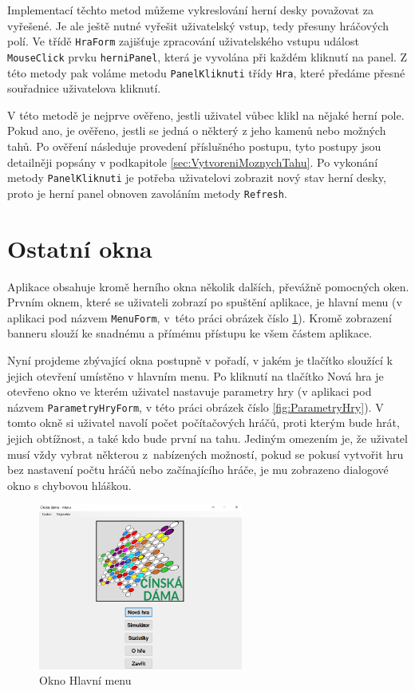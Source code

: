 Implementací těchto metod můžeme vykreslování herní desky považovat za vyřešené. Je ale ještě nutné vyřešit uživatelský vstup, tedy přesuny hráčových polí. Ve třídě \lstinline$HraForm$ zajišťuje zpracování uživatelského vstupu událost \lstinline$MouseClick$ prvku \lstinline$herniPanel$, která je vyvolána při každém kliknutí na panel. Z této metody pak voláme metodu \lstinline$PanelKliknuti$ třídy \lstinline$Hra$, které předáme přesné souřadnice uživatelova kliknutí. 

V této metodě je nejprve ověřeno, jestli uživatel vůbec klikl na nějaké herní pole. Pokud ano, je ověřeno, jestli se jedná o některý z jeho kamenů nebo možných tahů. Po ověření následuje provedení příslušného postupu, tyto postupy jsou detailněji popsány v podkapitole \ref{sec:VytvoreniMoznychTahu}. Po vykonání metody \lstinline$PanelKliknuti$ je potřeba uživatelovi zobrazit nový stav herní desky, proto je herní panel obnoven zavoláním metody \lstinline$Refresh$.


\section{Ostatní okna}
Aplikace obsahuje kromě herního okna několik dalších, převážně pomocných oken. Prvním oknem, které se uživateli zobrazí po spuštění aplikace, je hlavní menu (v aplikaci pod názvem \lstinline$MenuForm$, v~této práci obrázek číslo \ref{fig:HlavniMenu}). Kromě zobrazení banneru slouží ke snadnému a přímému přístupu ke všem částem aplikace.

Nyní projdeme zbývající okna postupně v pořadí, v jakém je tlačítko sloužící k jejich otevření umístěno v hlavním menu. Po kliknutí na tlačítko \textsf{Nová hra} je otevřeno okno ve kterém uživatel nastavuje parametry hry (v aplikaci pod názvem \lstinline$ParametryHryForm$, v této práci obrázek číslo \ref{fig:ParametryHry}). V tomto okně si uživatel navolí počet počítačových hráčů, proti kterým bude hrát, jejich obtížnost, a také kdo bude první na tahu. Jediným omezením je, že uživatel musí vždy vybrat některou z~nabízených možností, pokud se pokusí vytvořit hru bez nastavení počtu hráčů nebo začínajícího hráče, je mu zobrazeno dialogové okno s chybovou hláškou.

\begin{figure}
	\centering
	\includegraphics[width=0.6\textwidth]{Figures/HlavniMenu.png}
	\caption{Okno \textsf{Hlavní menu}}
    \label{fig:HlavniMenu}
\end{figure}


